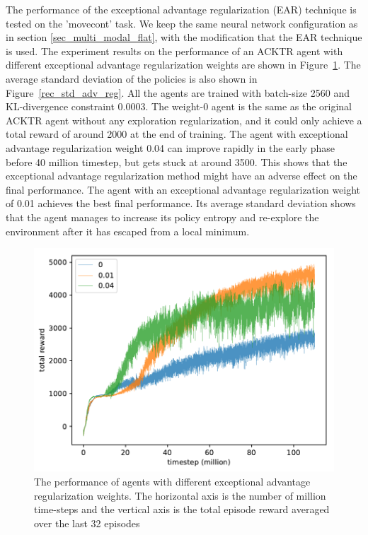 The performance of the exceptional advantage regularization (EAR) technique is tested on the 'movecont' task. We keep the same neural network configuration as in section \ref{sec_multi_modal_flat}, with the modification that the EAR technique is used.
The experiment results on the performance of an ACKTR agent with different exceptional advantage regularization weights are shown in Figure~\ref{rec_adv_reg}. The average standard deviation of the policies is also shown in Figure~\ref{rec_std_adv_reg}. All the agents are trained with batch-size 2560 and KL-divergence constraint 0.0003. The weight-0 agent is the same as the original ACKTR agent without any exploration regularization, and it could only achieve a total reward of around 2000 at the end of training. The agent with exceptional advantage regularization weight 0.04 can improve rapidly in the early phase before 40 million timestep, but gets stuck at around 3500. This shows that the exceptional advantage regularization method might have an adverse effect on the final performance. The agent with an exceptional advantage regularization weight of 0.01 achieves the best final performance. Its average standard deviation shows that the agent manages to increase its policy entropy and re-explore the environment after it has escaped from a local minimum.
\begin{figure}[!htbp]
	\includegraphics[width=\textwidth]{images/rec_180606_adv_reg.pdf}
	\centering
	\caption{The performance of agents with different exceptional advantage regularization weights. The horizontal axis is the number of million time-steps and the vertical axis is the total episode reward averaged over the last 32 episodes}\label{rec_adv_reg}
\end{figure}

